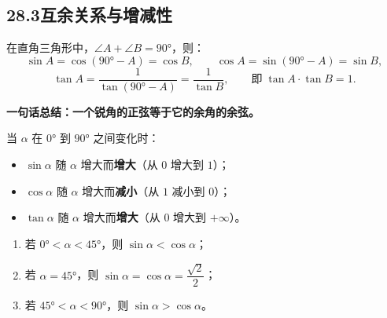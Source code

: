 \documentclass[12pt, a4paper]{ctexart}
\begin{document}
\subsection*{28.3\quad 互余关系与增减性}

\begin{knowledgebox}[互余关系]
在直角三角形中，$\angle A+\angle B=90°$，则：
\[
\sin A=\cos(90°-A)=\cos B,\qquad
\cos A=\sin(90°-A)=\sin B,
\]
\[
\tan A=\frac{1}{\tan(90°-A)}=\frac{1}{\tan B},\qquad \text{即}\;\tan A\cdot\tan B=1.
\]

\textbf{一句话总结：一个锐角的正弦等于它的余角的余弦。}
\end{knowledgebox}

\begin{knowledgebox}[锐角三角函数的增减性]
当 $\alpha$ 在 $0°$ 到 $90°$ 之间变化时：
\begin{itemize}[nosep]
  \item $\sin\alpha$ 随 $\alpha$ 增大而\textbf{增大}（从 $0$ 增大到 $1$）；
  \item $\cos\alpha$ 随 $\alpha$ 增大而\textbf{减小}（从 $1$ 减小到 $0$）；
  \item $\tan\alpha$ 随 $\alpha$ 增大而\textbf{增大}（从 $0$ 增大到 $+\infty$）。
\end{itemize}

\medskip
\begin{center}
\end{center}
\end{knowledgebox}

\begin{tipbox}[规律]
\begin{enumerate}[nosep]
  \item 若 $0°<\alpha<45°$，则 $\sin\alpha<\cos\alpha$；
  \item 若 $\alpha=45°$，则 $\sin\alpha=\cos\alpha=\dfrac{\sqrt{2}}{2}$；
  \item 若 $45°<\alpha<90°$，则 $\sin\alpha>\cos\alpha$。
\end{enumerate}
\end{tipbox}
\end{document}

